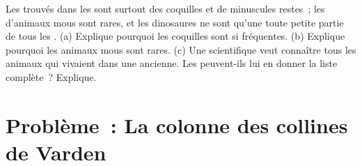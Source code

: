 \begin{exercise}[$\star\star\star$]\label{exo:g7:sediments-and-fossils:12}
Les  trouvés dans les  sont surtout des coquilles et de
minuscules restes~; les  d'animaux mous sont rares, et les
dinosaures ne sont qu'une toute petite partie de tous les . (a)
Explique pourquoi les coquilles sont si fréquentes. (b) Explique pourquoi
les animaux mous sont rares. (c) Une scientifique veut connaître tous les
animaux qui vivaient dans une  ancienne. Les  peuvent-ils lui
en donner la liste complète~? Explique.
\end{exercise}

\section{Problème~: La colonne des collines de Varden}

